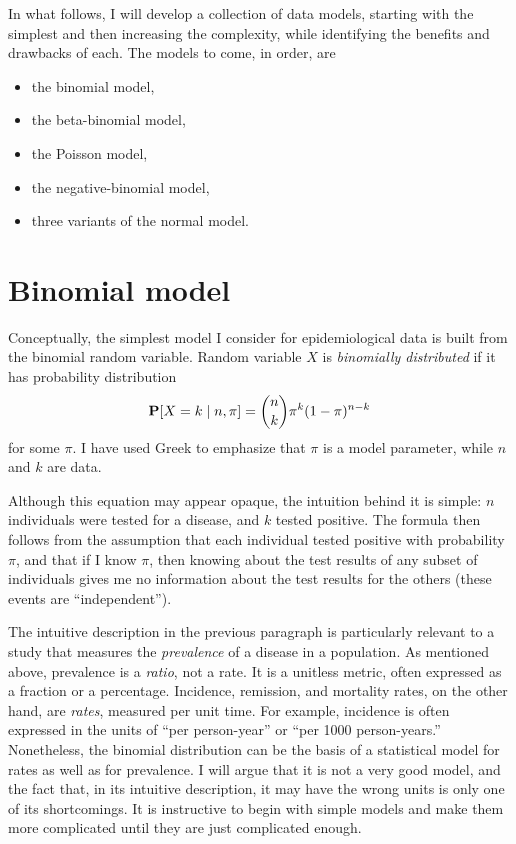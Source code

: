 In what follows, I will develop a collection of data models, starting
with the simplest and then increasing the complexity, while
identifying the benefits and drawbacks of each.  The models to come,
in order, are
\begin{itemize}
\item the binomial model,
\item the beta-binomial model,
\item the Poisson model,
\item the negative-binomial model,
\item three variants of the normal model.
\end{itemize}

\section{Binomial model}
Conceptually, the simplest model I consider for epidemiological data
is built from the binomial random variable. Random variable $X$ is
\emph{binomially distributed} if it has probability distribution
\[
\mathbf{P}[X=k\;|\; n, \pi] = \binom{n}{k}\pi^k(1-\pi)^{n-k}
\]
for some $\pi$.  I have used Greek to emphasize that $\pi$ is a model
parameter, while $n$ and $k$ are data.

Although this equation may appear opaque, the intuition behind it is
simple: $n$ individuals were tested for a disease, and $k$ tested
positive. The formula then follows from the assumption that each
individual tested positive with probability $\pi$, and that if I know
$\pi$, then knowing about the test results of any subset of
individuals gives me no information about the test results for the
others (these events are ``independent'').

The intuitive description in the previous paragraph is particularly
relevant to a study that measures the \emph{prevalence} of a disease
in a population.  As mentioned above, prevalence is a \emph{ratio}, not
a rate.  It is a unitless metric, often expressed as a fraction or a
percentage.  Incidence, remission, and mortality rates, on the other
hand, are \emph{rates}, measured per unit time.  For example,
incidence is often expressed in the units of ``per person-year'' or
``per 1000 person-years.''  Nonetheless, the binomial distribution can
be the basis of a statistical model for rates as well as for
prevalence.  I will argue that it is not a very good model, and the
fact that, in its intuitive description, it may have the wrong units is
only one of its shortcomings.  It is instructive to
begin with simple models and make them more complicated until they
are just complicated enough.


